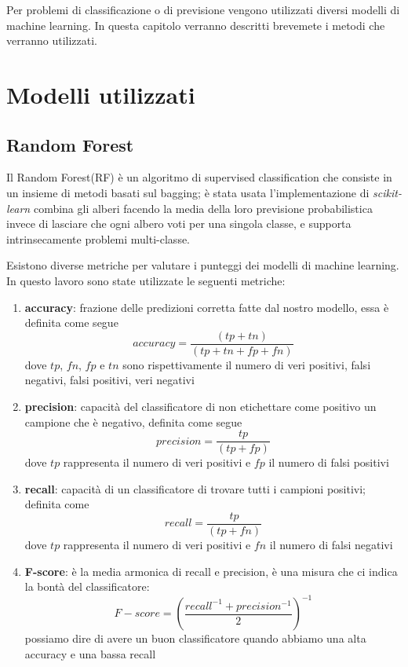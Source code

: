 Per problemi di classificazione o di previsione vengono utilizzati diversi modelli di machine learning. In questa capitolo verranno descritti brevemete i metodi che verranno utilizzati.
\section{Modelli utilizzati}
\subsection{Random Forest}
Il Random Forest(RF) è un algoritmo di supervised classification che consiste in un insieme di metodi basati sul bagging\cite{Random Forest}; è stata usata l'implementazione di \textit{scikit-learn} combina gli alberi facendo la media della loro previsione probabilistica invece di lasciare che ogni albero voti per una singola classe, e supporta intrinsecamente problemi multi-classe.

Esistono diverse metriche per valutare i punteggi dei modelli di machine learning. In questo lavoro sono state utilizzate le seguenti metriche:

\begin{enumerate}
    \item \textbf{accuracy}: frazione delle predizioni corretta fatte dal nostro modello, essa è definita come segue
    \begin{equation*} accuracy = \dfrac {(tp + tn)}{(tp + tn + fp + fn)}\end{equation*} 
    dove $tp$, $fn$, $fp$ e $tn$ sono rispettivamente il numero di veri positivi, falsi negativi, falsi positivi, veri negativi
    
    \item \textbf{precision}: capacità del classificatore di non etichettare come positivo un campione che è negativo, definita come segue
    \begin{equation*} precision = \dfrac {tp}{(tp + fp)}\end{equation*} 
    dove $tp$ rappresenta il numero di veri positivi e $fp$ il numero di falsi positivi
    
    \item \textbf{recall}: capacità di un classificatore di trovare tutti i campioni positivi; definita come
    \begin{equation*} recall = \dfrac {tp}{(tp + fn)}\end{equation*} 
    dove $tp$ rappresenta il numero di veri positivi e $fn$ il numero di falsi negativi
    
    \item \textbf{F-score}: è la media armonica di recall e precision, è una misura che ci indica la bontà del classificatore:
    \begin{equation*}F-score = \left ( \frac{recall^{-1} + precision^{-1}}{2} \right)^{-1}\end{equation*}
    possiamo dire di avere un buon classificatore quando abbiamo una alta accuracy e una bassa recall
    
\end{enumerate}

